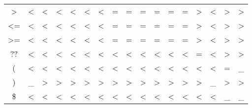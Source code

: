 \begin{table}[p]
\begin{tabular}{c|cccccccccccccccc}
\textgreater{} & \textless{} & \textless{} & \textless{} & \textless{} & \textless{} & \textless{} & = & = & = & = & = & = & \textgreater{} & \textless{} & \textgreater{} & \textgreater{} \\
\textless{}= & \textless{} & \textless{} & \textless{} & \textless{} & \textless{} & \textless{} & = & = & = & = & = & = & \textgreater{} & \textless{} & \textgreater{} & \textgreater{} \\
\textgreater{}= & \textless{} & \textless{} & \textless{} & \textless{} & \textless{} & \textless{} & = & = & = & = & = & = & \textgreater{} & \textless{} & \textgreater{} & \textgreater{} \\
?? & \textless{} & \textless{} & \textless{} & \textless{} & \textless{} & \textless{} & \textless{} & \textless{} & \textless{} & \textless{} & \textless{} & \textless{} & = & \textless{} & \textgreater{} & \textgreater{} \\
( & \textless{} & \textless{} & \textless{} & \textless{} & \textless{} & \textless{} & \textless{} & \textless{} & \textless{} & \textless{} & \textless{} & \textless{} & \textless{} & \textless{} & = & \_ \\
) & \_ & \textgreater{} & \textgreater{} & \textgreater{} & \textgreater{} & \textgreater{} & \textgreater{} & \textgreater{} & \textgreater{} & \textgreater{} & \textgreater{} & \textgreater{} & \textgreater{} & \_ & \textgreater{} & \textgreater{} \\
\$ & \textless{} & \textless{} & \textless{} & \textless{} & \textless{} & \textless{} & \textless{} & \textless{} & \textless{} & \textless{} & \textless{} & \textless{} & \textless{} & \textless{} & \_ & \_\\
\bottomrule
\end{tabular}
\end{table}
